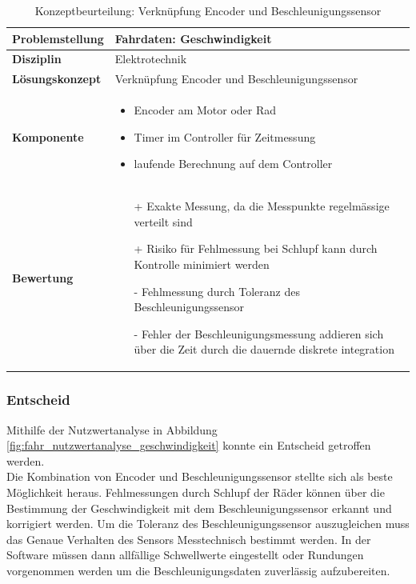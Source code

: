 \documentclass[../../main.tex]{subfiles}
\begin{document}
    \begin{flushleft}
        \begin{table}[H]
        \begin{tabular}{ | l | p{11cm} |}
        \hline
        \textbf{Problemstellung} & Fahrdaten: Geschwindigkeit \\ \hline
        \textbf{Disziplin} & Elektrotechnik \\ \hline
        \textbf{Lösungskonzept} & Verknüpfung Encoder und Beschleunigungssensor\\ \hline
        \textbf{Komponente} & \begin{itemize}
            \item Encoder am Motor oder Rad
            \item Timer im Controller für Zeitmessung
            \item laufende Berechnung auf dem Controller
            \end{itemize}\\ \hline
        \textbf{Bewertung} &  \begin{itemize}
                                \item[+] Exakte Messung, da die Messpunkte regelmässige verteilt sind
                                \item[+] Risiko für Fehlmessung bei Schlupf kann durch Kontrolle minimiert werden
                                \item[-] Fehlmessung durch Toleranz des Beschleunigungssensor 
                                \item[-] Fehler der Beschleunigungsmessung addieren sich über die Zeit durch die dauernde diskrete integration
                              \end{itemize} \\ \hline
        \end{tabular}
        \caption{Konzeptbeurteilung: Verknüpfung Encoder und Beschleunigungssensor}
        \label{tab:fahr_Encoder_Beschleunigung}
    \end{table}
    \end{flushleft}

    \subsubsection{Entscheid}
    Mithilfe der Nutzwertanalyse in Abbildung \ref{fig:fahr_nutzwertanalyse_geschwindigkeit} konnte ein Entscheid getroffen werden.\\
    Die Kombination von Encoder und Beschleunigungssensor stellte sich als beste Möglichkeit heraus. Fehlmessungen durch Schlupf der Räder können über die Bestimmung der Geschwindigkeit mit dem Beschleunigungssensor erkannt und korrigiert werden. Um die Toleranz des Beschleunigungssensor auszugleichen muss das Genaue Verhalten des Sensors Messtechnisch bestimmt werden. In der Software müssen dann allfällige Schwellwerte eingestellt oder Rundungen vorgenommen werden um die Beschleunigungsdaten zuverlässig aufzubereiten.   
        
\end{document}
